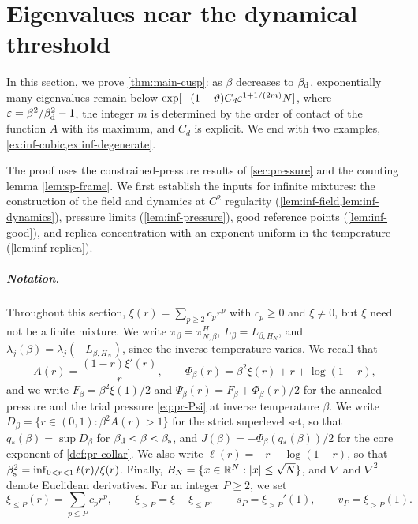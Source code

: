 \chapter{Eigenvalues near the dynamical threshold}\label{sec:infinite}

In this section, we prove \cref{thm:main-cusp}: as $\beta$ decreases to $\beta_{\mathrm d}$, exponentially many eigenvalues remain below $\exp[-(1-\vartheta)C_d\varepsilon^{1+1/(2m)}N]$, where $\varepsilon=\beta^2/\beta_{\mathrm d}^2-1$, the integer $m$ is determined by the order of contact of the function $A$ with its maximum, and $C_d$ is explicit. We end with two examples, \cref{ex:inf-cubic,ex:inf-degenerate}.

The proof uses the constrained-pressure results of \cref{sec:pressure} and the counting lemma \cref{lem:sp-frame}. We first establish the inputs for infinite mixtures: the construction of the field and dynamics at $C^2$ regularity (\cref{lem:inf-field,lem:inf-dynamics}), pressure limits (\cref{lem:inf-pressure}), good reference points (\cref{lem:inf-good}), and replica concentration with an exponent uniform in the temperature (\cref{lem:inf-replica}).

\paragraph{Notation.} Throughout this section, $\xi(r)=\sum_{p\ge2}c_pr^p$ with $c_p\ge0$ and $\xi\neq0$, but $\xi$ need not be a finite mixture. We write $\pi_\beta=\pi_{N,\beta}^{H}$, $L_\beta=L_{\beta,H_N}$, and $\lambda_j(\beta)=\lambda_j(-L_{\beta,H_N})$, since the inverse temperature varies. We recall that
\begin{equation*}
A(r)=\frac{(1-r)\xi'(r)}{r},\qquad \Phi_\beta(r)=\beta^2\xi(r)+r+\log(1-r),
\end{equation*}
and we write $F_\beta=\beta^2\xi(1)/2$ and $\Psi_\beta(r)=F_\beta+\Phi_\beta(r)/2$ for the annealed pressure and the trial pressure \eqref{eq:pr-Psi} at inverse temperature $\beta$. We write $D_\beta=\{r\in(0,1):\beta^2A(r)>1\}$ for the strict superlevel set, so that $q_*(\beta)=\sup D_\beta$ for $\beta_{\mathrm d}<\beta<\beta_{\mathrm s}$, and $J(\beta)=-\Phi_\beta(q_*(\beta))/2$ for the core exponent of \cref{def:pr-collar}. We also write $\ell(r)=-r-\log(1-r)$, so that $\beta_{\mathrm s}^2=\inf_{0<r<1}\ell(r)/\xi(r)$. Finally, $B_N=\{x\in\mathbb R^N:|x|\le\sqrt N\}$, and $\nabla$ and $\nabla^2$ denote Euclidean derivatives. For an integer $P\ge2$, we set
\begin{equation*}
\xi_{\le P}(r)=\sum_{p\le P}c_pr^p,\qquad \xi_{>P}=\xi-\xi_{\le P},\qquad s_P=\xi_{>P}'(1),\qquad v_P=\xi_{>P}(1).
\end{equation*}

